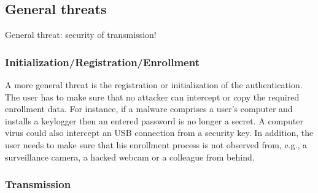 \subsection{General threats}

General threat: security of transmission!

\subsubsection{Initialization/Registration/Enrollment}

A more general threat is the registration or initialization of the authentication. The user has to make sure that no attacker can intercept or copy the required enrollment data. For instance, if a malware comprises a user’s computer and installs a keylogger then an entered password is no longer a secret. A computer virus could also intercept an USB connection from a security key. In addition, the user needs to make sure that his enrollment process is not observed from, e.g., a surveillance camera, a hacked webcam or a colleague from behind.

\subsubsection{Transmission}